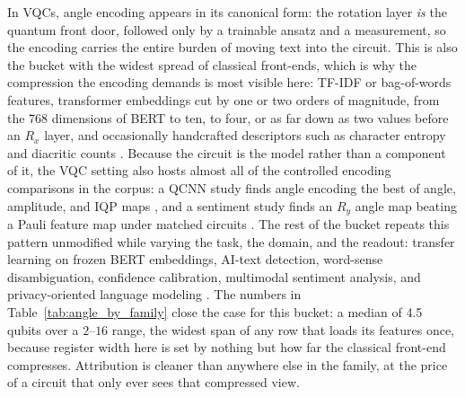 \documentclass{ieeeaccess}
\begin{document}
In VQCs, angle encoding appears in its canonical form: the rotation layer \emph{is} the quantum front door, followed only by a trainable ansatz and a measurement, so the encoding carries the entire burden of moving text into the circuit. This is also the bucket with the widest spread of classical front-ends, which is why the compression the encoding demands is most visible here: TF-IDF or bag-of-words features, transformer embeddings cut by one or two orders of magnitude, from the 768 dimensions of BERT to ten, to four, or as far down as two values before an $R_x$ layer, and occasionally handcrafted descriptors such as character entropy and diacritic counts \cite{thota_comparison_2025,ahmad_hybrid_2023,kumar_hybrid_2026,altintas_beyond_2025,mompelat_compact_2026}. Because the circuit is the model rather than a component of it, the VQC setting also hosts almost all of the controlled encoding comparisons in the corpus: a QCNN study finds angle encoding the best of angle, amplitude, and IQP maps \cite{ouamane_sentiment_2025}, and a sentiment study finds an $R_y$ angle map beating a Pauli feature map under matched circuits \cite{ruskanda_evaluating_2025}. The rest of the bucket repeats this pattern unmodified while varying the task, the domain, and the readout: transfer learning on frozen BERT embeddings, AI-text detection, word-sense disambiguation, confidence calibration, multimodal sentiment analysis, and privacy-oriented language modeling \cite{ardeshir-larijani_hybrid_2024,hazim_hqml-nlp_2026,karanath_quantum-enhanced_2025,li_pqlm_2023,neto_quantum_2024,chen_multi-scale_2025,hussain_quantum_2025-1,yan_exploring_2026}. The numbers in Table~\ref{tab:angle_by_family} close the case for this bucket: a median of 4.5 qubits over a $2$--$16$ range, the widest span of any row that loads its features once, because register width here is set by nothing but how far the classical front-end compresses. Attribution is cleaner than anywhere else in the family, at the price of a circuit that only ever sees that compressed view.
\end{document}
